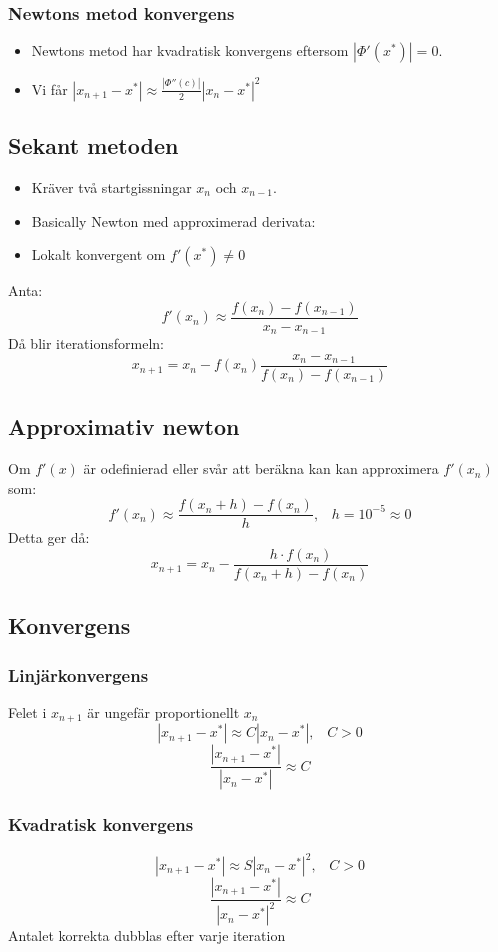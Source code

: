 \documentclass[a4paper,11pt]{article}
\begin{document}
\subsubsection{Newtons metod konvergens}
\begin{itemize}
    \item Newtons metod har kvadratisk konvergens eftersom $|\Phi'(x^*)| = 0$.
    \item Vi får $|x_{n+1} - x^*| \approx \frac{|\Phi''(c)|}{2}|x_n - x^*|^2$
\end{itemize}
\newpage
\subsection{Sekant metoden}
\begin{itemize}
    \item Kräver två startgissningar $x_n$ och $x_{n-1}$.
    \item Basically Newton med approximerad derivata:
    \item Lokalt konvergent om $f'(x^*) \neq 0$
\end{itemize}
Anta:
\[
f'(x_n) \approx \frac{f(x_n) - f(x_{n-1})}{x_n - x_{n-1}}
\]
Då blir iterationsformeln:
\[
x_{n+1} = x_n - f(x_n)\frac{x_n - x_{n-1}}{f(x_n) - f(x_{n-1})}
\]

\subsection{Approximativ newton}
Om $f'(x)$ är odefinierad eller svår att beräkna kan kan approximera $f'(x_n)$ som:
$$f'(x_n) \approx \frac{f(x_n + h) - f(x_n)}{h}, \hspace{10pt} h = 10^{-5} \approx 0$$
Detta ger då:
$$x_{n+1} = x_n - \frac{h \cdot f(x_n)}{f(x_n + h) - f(x_n)}$$

\subsection{Konvergens}
\subsubsection{Linjärkonvergens}
Felet i $x_{n+1}$ är ungefär proportionellt $x_n$
$$|x_{n+1} - x^*| \approx C|x_n - x^*|, \hspace{10pt} C > 0$$
$$\frac{|x_{n+1} - x^*|}{|x_n - x^*|} \approx C$$

\subsubsection{Kvadratisk konvergens}
$$|x_{n+1} - x^*| \approx S|x_n - x^*|^2, \hspace{10pt} C > 0$$
$$\frac{|x_{n+1} - x^*|}{|x_n - x^*|^2} \approx C$$
Antalet korrekta dubblas efter varje iteration
\end{document}
